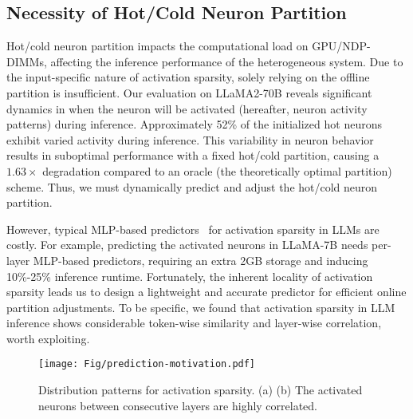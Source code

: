 \subsection{Necessity of Hot/Cold Neuron Partition} \label{sec:similar}

Hot/cold neuron partition impacts the computational load on GPU/NDP-DIMMs, affecting the inference performance of the heterogeneous system. Due to the input-specific nature of activation sparsity, solely relying on the offline partition is insufficient. Our evaluation on LLaMA2-70B reveals significant dynamics in when the neuron will be activated (hereafter, neuron activity patterns) during inference. Approximately 52\% of the initialized hot neurons exhibit varied activity during inference. This variability in neuron behavior results in suboptimal performance with a fixed hot/cold partition, causing a $1.63\times$ degradation compared to an oracle (the theoretically optimal partition) scheme. Thus, we must dynamically predict and adjust the hot/cold neuron partition.

However, typical MLP-based predictors~\cite{liu2023deja, song2024prosparse, zhang2024relu, mirzadeh2023relu} for activation sparsity in LLMs are costly. For example, predicting the activated neurons in LLaMA-7B needs per-layer MLP-based predictors, requiring an extra 2GB storage and inducing 10\%-25\% inference runtime. Fortunately, the inherent locality of activation sparsity leads us to design a lightweight and accurate predictor for efficient online partition adjustments. To be specific, we found that activation sparsity in LLM inference shows considerable token-wise similarity and layer-wise correlation, worth exploiting.

\begin{figure}[t]
    \centering
    \texttt{[image: Fig/prediction-motivation.pdf]}
    \vspace{-0.3cm}
   \caption{Distribution patterns for activation sparsity. (a)  (b) The activated neurons between consecutive layers are highly correlated.}
    \label{fig:similarity}
\vspace{-0.3cm}
\end{figure}

